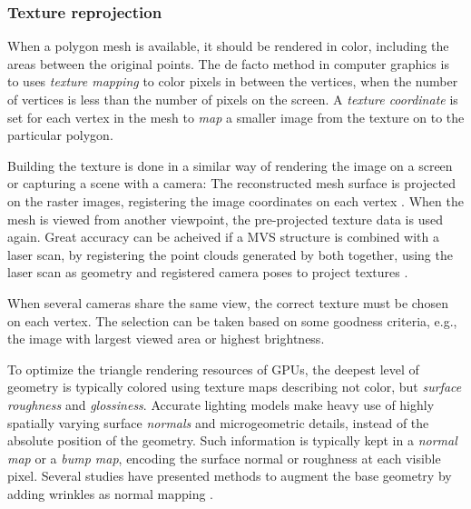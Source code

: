 
\subsubsection{Texture reprojection} %

When a polygon mesh is available, it should be rendered in color, including the areas between the original points.
The de facto method in computer graphics is to uses \emph{texture mapping} to color pixels in between the vertices, when the number of vertices is less than the number of pixels on the screen.
A \emph{texture coordinate} is set for each vertex in the mesh to \emph{map} a smaller image from the texture on to the particular polygon. \cite{foley1990computer,heckbert1986survey}

Building the texture is done in a similar way of rendering the image on a screen or capturing a scene with a camera:
The reconstructed mesh surface is projected on the raster images, registering the image coordinates on each vertex \cite[p.~610]{szeliski10vision} \cite[p.~98]{heyden2005multiple}.
When the mesh is viewed from another viewpoint, the pre-projected texture data is used again.
Great accuracy can be acheived if a MVS structure is combined with a laser scan, by registering the point clouds generated by both together, using the laser scan as geometry and registered camera poses to project textures \cite{liu2006multiview}.

When several cameras share the same view, the correct texture must be chosen on each vertex.
The selection can be taken based on some goodness criteria, e.g., the image with largest viewed area or highest brightness.


To optimize the triangle rendering resources of GPUs, the deepest level of geometry is typically colored using texture maps describing not color, but \emph{surface roughness} and \emph{glossiness}.
Accurate lighting models make heavy use of highly spatially varying surface \emph{normals} and microgeometric details, instead of the absolute position of the geometry.
Such information is typically kept in a \emph{normal map} or a \emph{bump map}, encoding the surface normal or roughness at each visible pixel.
Several studies have presented methods to augment the base geometry by adding wrinkles as normal mapping \cite{bickel2007multi}.

